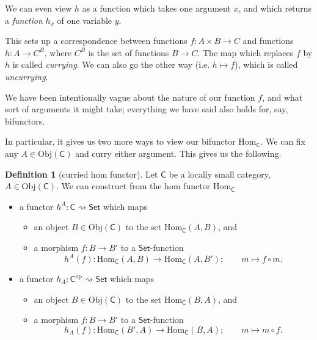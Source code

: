 \documentclass[a4paper,10pt]{scrreprt}
\newcommand{\Obj}{\mathrm{Obj}}
\newcommand{\Hom}{\mathrm{Hom}}
\theoremstyle{definition}
\newtheorem{definition}{Definition}[section]
\theoremstyle{plain}
\theoremstyle{remark}
\begin{document}
We can even view $h$ as a function which takes one argument $x$, and which returns a \emph{function} $h_{x}$ of one variable $y$.

This sets up a correspondence between functions $f\colon A \times B \to C$ and functions $h\colon A \to C^{B}$, where $C^{B}$ is the set of functions $B \to C$. The map which replaces $f$ by $h$ is called \emph{currying}. We can also go the other way (i.e. $h \mapsto f$), which is called \emph{uncurrying}.

We have been intentionally vague about the nature of our function $f$, and what sort of arguments it might take; everything we have said also holds for, say, bifunctors.

In particular, it gives us two more ways to view our bifunctor $\Hom_{\mathsf{C}}$. We can fix any $A \in \Obj(\mathsf{C})$ and curry either argument. This gives us the following.

\begin{definition}[curried hom functor]
  \label{def:curriedhomfunctor}
  Let $\mathsf{C}$ be a locally small category, $A \in \Obj(\mathsf{C})$. We can construct from the hom functor $\Hom_{\mathsf{C}}$
  \begin{itemize}
    \item a functor $h^{A}\colon \mathsf{C} \rightsquigarrow \mathsf{Set}$ which maps
      \begin{itemize}
        \item an object $B \in \Obj(\mathsf{C})$ to the set $\Hom_{\mathsf{C}}(A, B)$, and

        \item a morphism $f\colon B \to B'$ to a $\mathsf{Set}$-function
          \begin{equation*}
            h^{A}(f)\colon \Hom_{\mathsf{C}}(A, B) \to \Hom_{\mathsf{C}}(A, B'); \qquad m \mapsto f \circ m.
          \end{equation*} 
      \end{itemize}

    \item a functor $h_{A}\colon \mathsf{C}^{\mathrm{op}} \rightsquigarrow \mathsf{Set}$ which maps
      \begin{itemize}
        \item an object $B \in \Obj(\mathsf{C})$ to the set $\Hom_{\mathsf{C}}(B, A)$, and

        \item a morphism $f\colon B \to B'$ to a $\mathsf{Set}$-function
          \begin{equation*}
            h_{A}(f)\colon \Hom_{\mathsf{C}}(B', A) \to \Hom_{\mathsf{C}}(B, A); \qquad m \mapsto m \circ f.
          \end{equation*} 
      \end{itemize}
  \end{itemize}
\end{definition}
\end{document}
